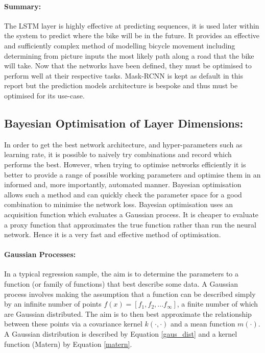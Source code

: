 \documentclass[11pt,twoside]{report}
\begin{document}
\paragraph{Summary:}

The LSTM layer is highly effective at predicting sequences, it is used later within the system to predict where the bike will be in the future. It provides an effective and sufficiently complex method of modelling bicycle movement including determining from picture inputs the most likely path along a road that the bike will take. Now that the networks have been defined, they must be optimised to perform well at their respective tasks. Mask-RCNN is kept as default in this report but the prediction models architecture is bespoke and thus must be optimised for its use-case.
 
\subsection{Bayesian Optimisation of Layer Dimensions:}
In order to get the best network architecture, and hyper-parameters such as learning rate, it is possible to naively try combinations and record which performs the best. However, when trying to optimise networks efficiently it is better to provide a range of possible working parameters and optimise them in an informed and, more importantly, automated manner. Bayesian optimisation allows such a method and can quickly check the parameter space for a good combination to minimise the network loss. Bayesian optimisation uses an acquisition function which evaluates a Gaussian process. It is cheaper to evaluate a proxy function that approximates the true function rather than run the neural network. Hence it is a very fast and effective method of optimisation.

\paragraph{Gaussian Processes:}
In a typical regression sample, the aim is to determine the parameters to a function (or family of functions) that best describe some data. A Gaussian process involves making the assumption that a function can be described simply by an infinite number of points $f(x) = [f_{1},f_{2},...f_{\infty}]$, a finite number of which are Gaussian distributed. The aim is to then best approximate the relationship between these points via a covariance kernel $k(\cdot,\cdot)$ and a mean function $m(\cdot)$. A Gaussian distribution is described by Equation \ref{gaus_dist} and a kernel function (Matern) by Equation \ref{matern}.
\end{document}
